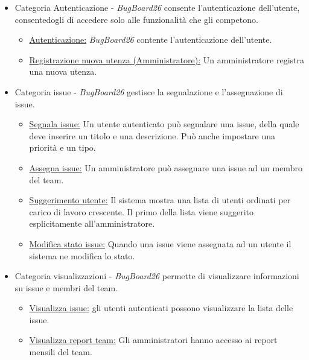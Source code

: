 \documentclass[a4paper,12pt]{article}
\begin{document}
\begin{itemize}
    \item Categoria Autenticazione - \textit{BugBoard26} consente l'autenticazione dell'utente, consentedogli di accedere solo alle funzionalità che gli competono.
    \begin{itemize}
        \item \hyperref[sec:RE01]{Autenticazione:} \textit{BugBoard26} contente l'autenticazione dell'utente.
        \item \hyperref[sec:RE02]{Registrazione nuova utenza (Amministratore):} Un amministratore registra una nuova utenza. 
    \end{itemize}
    \item Categoria issue - \textit{BugBoard26} gestisce la segnalazione e l'assegnazione di issue.
    \begin{itemize}
        \item \hyperref[sec:RE03]{Segnala issue:} Un utente autenticato può segnalare una issue, della quale deve inserire un titolo e una descrizione. Può anche impostare una priorità e un tipo. 
        \item \hyperref[sec:RE04]{Assegna issue:} Un amministratore può assegnare una issue ad un membro del team.
        \item\hyperref[sec:RE13]{Suggerimento utente:} Il sistema mostra una lista di utenti ordinati per carico di lavoro crescente. Il primo della lista viene suggerito esplicitamente all'amministratore.
        \item \hyperref[sec:RE04]{Modifica stato issue:} Quando una issue viene assegnata ad un utente il sistema ne modifica lo stato. 
    \end{itemize}
    \item Categoria visualizzazioni -  \textit{BugBoard26} permette di visualizzare informazioni su issue e membri del team.
    \begin{itemize}
        \item \hyperref[sec:RE05]{Visualizza issue:} gli utenti autenticati possono visualizzare la lista delle issue.
        \item \hyperref[sec:RE06]{Visualizza report team:} Gli amministratori hanno accesso ai report mensili del team.

\end{itemize}
\end{itemize}
\end{document}
